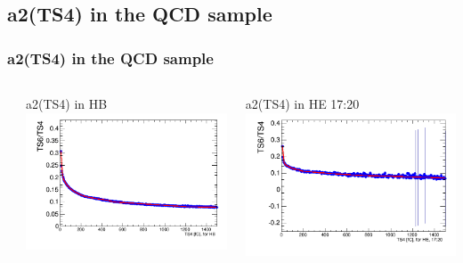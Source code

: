 \documentclass[bigger]{beamer}
\begin{document}
\subsection{a2(TS4) in the QCD sample}
\label{sec-3-5}
\begin{frame}
\frametitle{a2(TS4) in the QCD sample}
\label{sec-3-5-1}
\begin{columns} %
\label{sec-3-5-1-1}
\begin{column}{0.55\textwidth}
\label{sec-3-5-1-1-1}

\centering
a2(TS4) in HB
\includegraphics[width=\textwidth]{fig/a2_ring0.png}
\end{column}
\begin{column}{0.55\textwidth}
\label{sec-3-5-1-1-2}

\centering
a2(TS4) in HE 17:20
\includegraphics[width=\textwidth]{fig/a2_ring1.png}
\end{column}
\end{columns}
\end{frame}
\end{document}
